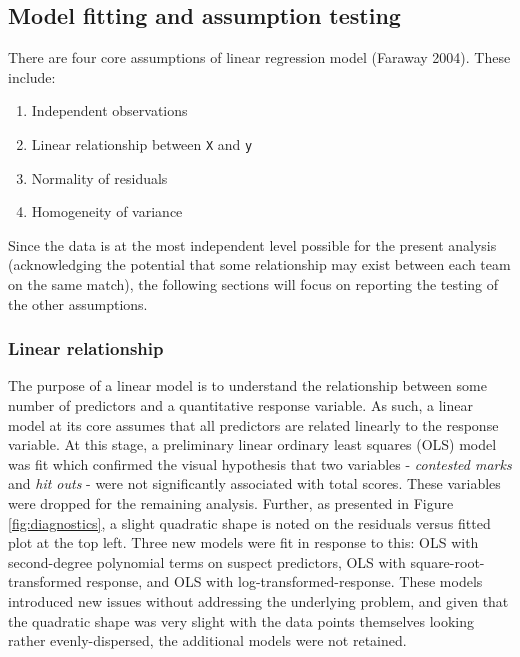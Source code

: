 \documentclass{article}
\begin{document}
\hypertarget{model-fitting-and-assumption-testing}{%
\subsection{Model fitting and assumption testing}\label{model-fitting-and-assumption-testing}}

There are four core assumptions of linear regression model (Faraway 2004). These include:

\begin{enumerate}
\def\labelenumi{\arabic{enumi}.}
\tightlist
\item
  Independent observations
\item
  Linear relationship between \texttt{X} and \texttt{y}
\item
  Normality of residuals
\item
  Homogeneity of variance
\end{enumerate}

Since the data is at the most independent level possible for the present analysis (acknowledging the potential that some relationship may exist between each team on the same match), the following sections will focus on reporting the testing of the other assumptions.

\hypertarget{linear-relationship}{%
\subsubsection{Linear relationship}\label{linear-relationship}}

The purpose of a linear model is to understand the relationship between some number of predictors and a quantitative response variable. As such, a linear model at its core assumes that all predictors are related linearly to the response variable. At this stage, a preliminary linear ordinary least squares (OLS) model was fit which confirmed the visual hypothesis that two variables - \emph{contested marks} and \emph{hit outs} - were not significantly associated with total scores. These variables were dropped for the remaining analysis. Further, as presented in Figure \ref{fig:diagnostics}, a slight quadratic shape is noted on the residuals versus fitted plot at the top left. Three new models were fit in response to this: OLS with second-degree polynomial terms on suspect predictors, OLS with square-root-transformed response, and OLS with log-transformed-response. These models introduced new issues without addressing the underlying problem, and given that the quadratic shape was very slight with the data points themselves looking rather evenly-dispersed, the additional models were not retained.
\end{document}
